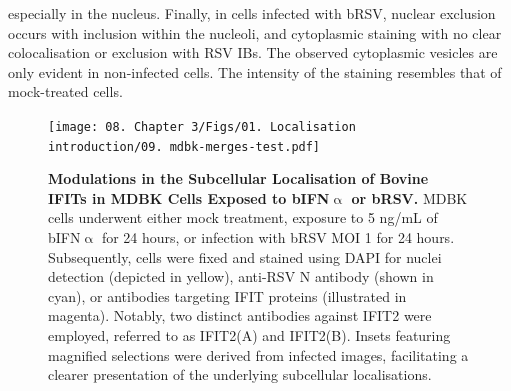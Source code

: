 especially in the nucleus. Finally, in cells infected with bRSV, nuclear exclusion occurs with inclusion within the nucleoli, and cytoplasmic staining with no clear colocalisation or exclusion with RSV IBs. The observed cytoplasmic vesicles are only evident in non-infected cells. The intensity of the staining resembles that of mock-treated cells.

\begin{figure}
    \centering
    \texttt{[image: 08. Chapter 3/Figs/01. Localisation introduction/09. mdbk-merges-test.pdf]}
    \caption[Modulations in the Subcellular Localisation of Bovine IFITs in MDBK Cells Exposed to bIFN$\upalpha$ or bRSV.]{\textbf{Modulations in the Subcellular Localisation of Bovine IFITs in MDBK Cells Exposed to bIFN$\upalpha$ or bRSV.} MDBK cells underwent either mock treatment, exposure to 5 ng/mL of bIFN$\upalpha$ for 24 hours, or infection with bRSV MOI 1 for 24 hours. Subsequently, cells were fixed and stained using DAPI for nuclei detection (depicted in yellow), anti-RSV N antibody (shown in cyan), or antibodies targeting IFIT proteins (illustrated in magenta). Notably, two distinct antibodies against IFIT2 were employed, referred to as IFIT2(A) and IFIT2(B). Insets featuring magnified selections were derived from infected images, facilitating a clearer presentation of the underlying subcellular localisations.}
    \label{fig:Modulations in the Subcellular Localisation of Bovine IFITs in MDBK Cells Exposed to bIFNa or bRSV}
\end{figure}

